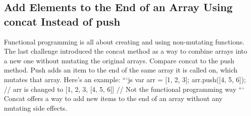 \documentclass{article}%
\begin{document}
%
\subsection{Add Elements to the End of an Array Using concat Instead of push}%
\label{subsec:AddElementstotheEndofanArrayUsingconcatInsteadofpush}%
Functional programming is all about creating and using non{-}mutating functions.\newline%
The last challenge introduced the concat method as a way to combine arrays into a new one without mutating the original arrays. Compare concat to the push method. Push adds an item to the end of the same array it is called on, which mutates that array. Here's an example:\newline%
```js\newline%
var arr = {[}1, 2, 3{]};\newline%
arr.push({[}4, 5, 6{]});\newline%
// arr is changed to {[}1, 2, 3, {[}4, 5, 6{]}{]}\newline%
// Not the functional programming way\newline%
```\newline%
Concat offers a way to add new items to the end of an array without any mutating side effects.\newline%

%
\end{document}
